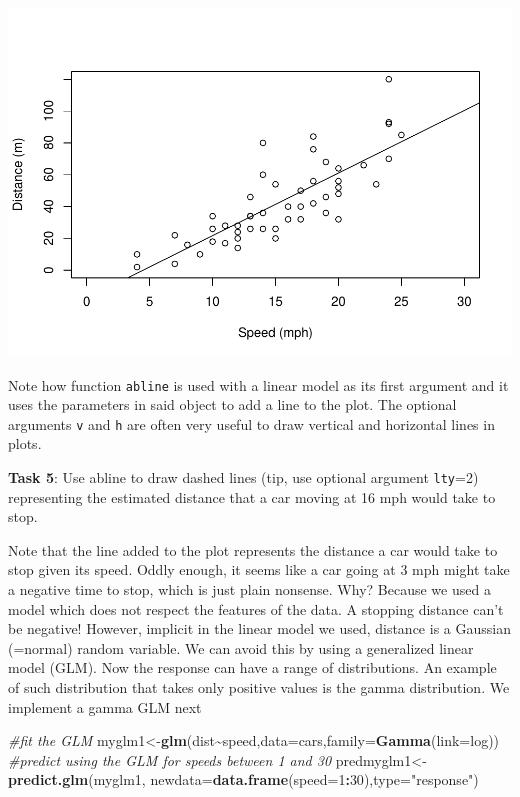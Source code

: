 \documentclass[
]{article}
\newenvironment{Shaded}{\begin{snugshade}}{\end{snugshade}}
\newcommand{\AttributeTok}[1]{\textcolor[rgb]{0.13,0.29,0.53}{#1}}
\newcommand{\CommentTok}[1]{\textcolor[rgb]{0.56,0.35,0.01}{\textit{#1}}}
\newcommand{\DecValTok}[1]{\textcolor[rgb]{0.00,0.00,0.81}{#1}}
\newcommand{\FunctionTok}[1]{\textcolor[rgb]{0.13,0.29,0.53}{\textbf{#1}}}
\newcommand{\NormalTok}[1]{#1}
\newcommand{\OtherTok}[1]{\textcolor[rgb]{0.56,0.35,0.01}{#1}}
\newcommand{\SpecialCharTok}[1]{\textcolor[rgb]{0.81,0.36,0.00}{\textbf{#1}}}
\newcommand{\StringTok}[1]{\textcolor[rgb]{0.31,0.60,0.02}{#1}}
\begin{document}
\includegraphics{TAMsIntro2RviaRStudioTutorial_files/figure-latex/chunck159-1.pdf}

Note how function \texttt{abline} is used with a linear model as its
first argument and it uses the parameters in said object to add a line
to the plot. The optional arguments \texttt{v} and \texttt{h} are often
very useful to draw vertical and horizontal lines in plots.

\textbf{Task 5}: Use abline to draw dashed lines (tip, use optional
argument \texttt{lty}=2) representing the estimated distance that a car
moving at 16 mph would take to stop.

Note that the line added to the plot represents the distance a car would
take to stop given its speed. Oddly enough, it seems like a car going at
3 mph might take a negative time to stop, which is just plain nonsense.
Why? Because we used a model which does not respect the features of the
data. A stopping distance can't be negative! However, implicit in the
linear model we used, distance is a Gaussian (=normal) random variable.
We can avoid this by using a generalized linear model (GLM). Now the
response can have a range of distributions. An example of such
distribution that takes only positive values is the gamma distribution.
We implement a gamma GLM next

\begin{Shaded}
\begin{Highlighting}[]
\CommentTok{\#fit the GLM}
\NormalTok{myglm1}\OtherTok{\textless{}{-}}\FunctionTok{glm}\NormalTok{(dist}\SpecialCharTok{\textasciitilde{}}\NormalTok{speed,}\AttributeTok{data=}\NormalTok{cars,}\AttributeTok{family=}\FunctionTok{Gamma}\NormalTok{(}\AttributeTok{link=}\NormalTok{log))}
\CommentTok{\#predict using the GLM for speeds between 1 and 30}
\NormalTok{predmyglm1}\OtherTok{\textless{}{-}}\FunctionTok{predict.glm}\NormalTok{(myglm1,}
\AttributeTok{newdata=}\FunctionTok{data.frame}\NormalTok{(}\AttributeTok{speed=}\DecValTok{1}\SpecialCharTok{:}\DecValTok{30}\NormalTok{),}\AttributeTok{type=}\StringTok{"response"}\NormalTok{)}
\end{Highlighting}
\end{Shaded}
\end{document}
